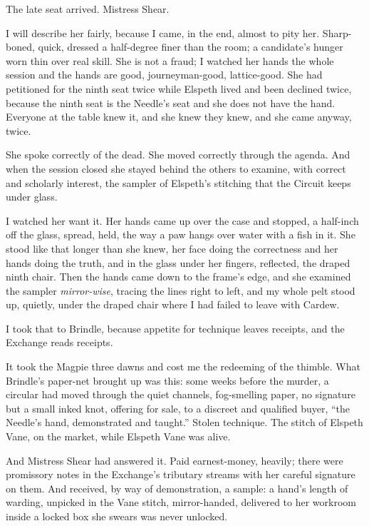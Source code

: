 The late seat arrived. Mistress Shear.

I will describe her fairly, because I came, in the end, almost to pity her. Sharp-boned, quick, dressed a half-degree finer than the room; a candidate's hunger worn thin over real skill. She is not a fraud; I watched her hands the whole session and the hands are good, journeyman-good, lattice-good. She had petitioned for the ninth seat twice while Elspeth lived and been declined twice, because the ninth seat is the Needle's seat and she does not have the hand. Everyone at the table knew it, and she knew they knew, and she came anyway, twice.

She spoke correctly of the dead. She moved correctly through the agenda. And when the session closed she stayed behind the others to examine, with correct and scholarly interest, the sampler of Elspeth's stitching that the Circuit keeps under glass.

I watched her want it. Her hands came up over the case and stopped, a half-inch off the glass, spread, held, the way a paw hangs over water with a fish in it. She stood like that longer than she knew, her face doing the correctness and her hands doing the truth, and in the glass under her fingers, reflected, the draped ninth chair. Then the hands came down to the frame's edge, and she examined the sampler \emph{mirror-wise}, tracing the lines right to left, and my whole pelt stood up, quietly, under the draped chair where I had failed to leave with Cardew.

I took that to Brindle, because appetite for technique leaves receipts, and the Exchange reads receipts.

It took the Magpie three dawns and cost me the redeeming of the thimble. What Brindle's paper-net brought up was this: some weeks before the murder, a circular had moved through the quiet channels, fog-smelling paper, no signature but a small inked knot, offering for sale, to a discreet and qualified buyer, ``the Needle's hand, demonstrated and taught.'' Stolen technique. The stitch of Elspeth Vane, on the market, while Elspeth Vane was alive.

And Mistress Shear had answered it. Paid earnest-money, heavily; there were promissory notes in the Exchange's tributary streams with her careful signature on them. And received, by way of demonstration, a sample: a hand's length of warding, unpicked in the Vane stitch, mirror-handed, delivered to her workroom inside a locked box she swears was never unlocked.

